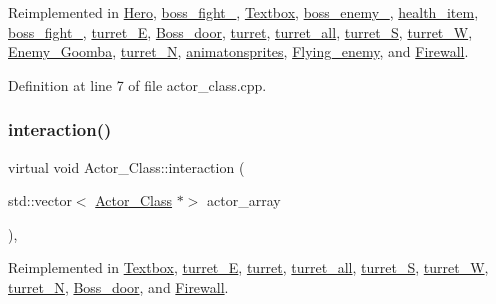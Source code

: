 Reimplemented in \hyperlink{class_hero_abc9f2dece1e3757ba2b315a332f995c2}{Hero}, \hyperlink{classboss__fight__3_adcab7141b564704e89778a3303d529a7}{boss\+\_\+fight\+\_}, \hyperlink{class_textbox_a164e6dfbd1964b36b05de0cf84d07abf}{Textbox}, \hyperlink{classboss__enemy__2_aea8e734cf65b63f1d8ba143f3b449f63}{boss\+\_\+enemy\+\_}, \hyperlink{classhealth__item_aa9b9410c9e524d807327e682e11d1482}{health\+\_\+item}, \hyperlink{classboss__fight__1_a83b20e761e3f8781c8fee8d2be5442b0}{boss\+\_\+fight\+\_}, \hyperlink{classturret___e_a55fc34335f9afb92a126da741a82f62a}{turret\+\_\+E}, \hyperlink{class_boss__door_a093ca3c013ae4f5f703675bc6d3de9f0}{Boss\+\_\+door}, \hyperlink{classturret_ae396c3a39ef7556070e1a0b55bea2970}{turret}, \hyperlink{classturret__all_ab13a06bdbc2244a7a4460ffc8671f2bd}{turret\+\_\+all}, \hyperlink{classturret___s_ad5699c9932a20914961dde81c5a96d86}{turret\+\_\+S}, \hyperlink{classturret___w_a9dce201a49a87d2a9e03c9efea6361e8}{turret\+\_\+W}, \hyperlink{class_enemy___goomba_a1947885e29f42889e42947462a9caeb3}{Enemy\+\_\+\+Goomba}, \hyperlink{classturret___n_a2f584be23fc5f0e44fbfda79bc3733b7}{turret\+\_\+N}, \hyperlink{classanimatonsprites_ac009e9d25649abc90551981421de9f72}{animatonsprites}, \hyperlink{class_flying__enemy_a2d8bc9f4c82ec045da7346bd3613bfcb}{Flying\+\_\+enemy}, and \hyperlink{class_firewall_a3e67e39efb0a425acd1f009f86e434ee}{Firewall}.



Definition at line 7 of file actor\+\_\+class.\+cpp.

\hypertarget{class_actor___class_a87d1e079d8576fa99592a60b38a04a1b}{}\label{class_actor___class_a87d1e079d8576fa99592a60b38a04a1b} 
\subsubsection{\texorpdfstring{interaction()}{interaction()}}
{\footnotesize\ttfamily virtual void Actor\+\_\+\+Class\+::interaction (\begin{DoxyParamCaption}\item[{std\+::vector$<$ \hyperlink{class_actor___class}{Actor\+\_\+\+Class} $\ast$$>$}]{actor\+\_\+array }\end{DoxyParamCaption})\hspace{0.3cm}{\ttfamily [inline]}, {\ttfamily [virtual]}}



Reimplemented in \hyperlink{class_textbox_a67dd5640da6bbd88affded4a37ede098}{Textbox}, \hyperlink{classturret___e_a34cfbe8887180d443eca15fd71370964}{turret\+\_\+E}, \hyperlink{classturret_aa6733d8f9b2d5773271a1ed3b4b88aab}{turret}, \hyperlink{classturret__all_a6491dcec10ab94ccf35bb371d014e17f}{turret\+\_\+all}, \hyperlink{classturret___s_ae7e579ddf3982d6914491784595f1c16}{turret\+\_\+S}, \hyperlink{classturret___w_a3b071bffcc2d407b88d4eca47e4820e0}{turret\+\_\+W}, \hyperlink{classturret___n_a33cfa60542db12f35678ebc3d479491f}{turret\+\_\+N}, \hyperlink{class_boss__door_ab80f398f1c479f78c2b36409c311ccb5}{Boss\+\_\+door}, and \hyperlink{class_firewall_a21c3c46eaf7bb026b73a77b0288fa232}{Firewall}.



